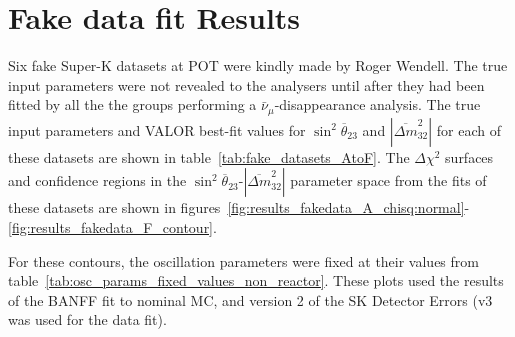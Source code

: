 
\section{Fake data fit Results}

\label{app:fake_data_fit_results}

Six fake Super-K datasets at \FakePot POT were kindly made by Roger Wendell. The true input parameters 
were not revealed to the analysers until after they had been fitted by all the the groups performing a 
$\bar{\nu}_{\mu}$-disappearance analysis. The true input parameters and VALOR best-fit values for 
$\sin^{2}\overline{\theta}_{23}$ and $|\overline{\Delta m}^{2}_{32}|$ for each of these datasets are shown 
in table~\ref{tab:fake_datasets_AtoF}. The $\Delta \chi^{2}$ surfaces and confidence regions in the 
$\sin^{2}\overline{\theta}_{23}$-$|\overline{\Delta m}^{2}_{32}|$ parameter space from the fits of these datasets 
are shown in figures~\ref{fig:results_fakedata_A_chisq:normal}-\ref{fig:results_fakedata_F_contour}.

For these contours, the oscillation parameters were fixed at their values from table~\ref{tab:osc_params_fixed_values_non_reactor}.
These plots used the results of the BANFF fit to nominal MC, and version 2 of the SK Detector Errors (v3 was used for the data fit).


